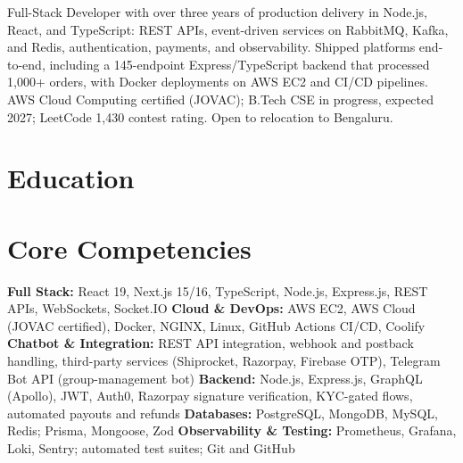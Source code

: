 \documentclass[11pt,a4paper,sans]{moderncv}
\begin{document}
\makecvtitle


\vspace{4pt}
\small{Full-Stack Developer with over three years of production delivery in Node.js, React, and TypeScript: REST APIs, event-driven services on RabbitMQ, Kafka, and Redis, authentication, payments, and observability. Shipped platforms end-to-end, including a 145-endpoint Express/TypeScript backend that processed 1,000+ orders, with Docker deployments on AWS EC2 and CI/CD pipelines. AWS Cloud Computing certified (JOVAC); B.Tech CSE in progress, expected 2027; LeetCode 1,430 contest rating. Open to relocation to Bengaluru.}


\section{Education}
\vspace{1pt}


\section{Core Competencies}
\vspace{1pt}
\raggedright
\textbf{Full Stack:} React 19, Next.js 15/16, TypeScript, Node.js, Express.js, REST APIs, WebSockets, Socket.IO \textbar{}
\textbf{Cloud \& DevOps:} AWS EC2, AWS Cloud (JOVAC certified), Docker, NGINX, Linux, GitHub Actions CI/CD, Coolify \textbar{}
\textbf{Chatbot \& Integration:} REST API integration, webhook and postback handling, third-party services (Shiprocket, Razorpay, Firebase OTP), Telegram Bot API (group-management bot) \textbar{}
\textbf{Backend:} Node.js, Express.js, GraphQL (Apollo), JWT, Auth0, Razorpay signature verification, KYC-gated flows, automated payouts and refunds \textbar{}
\textbf{Databases:} PostgreSQL, MongoDB, MySQL, Redis; Prisma, Mongoose, Zod \textbar{}
\textbf{Observability \& Testing:} Prometheus, Grafana, Loki, Sentry; automated test suites; Git and GitHub
\par\normalfont
\end{document}
